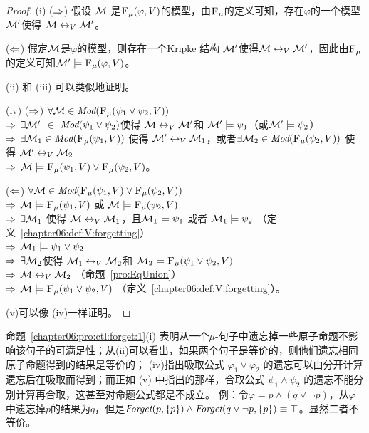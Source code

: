 \begin{proof}
	(i) ($\Rightarrow$) 假设 ${\cal M}$ 是${\textsc{F}_{\textsc{$\mu$}}}(\varphi, V)$的模型，由${\textsc{F}_{\textsc{$\mu$}}}$的定义可知，存在$\varphi$的一个模型${\cal M}'$使得 ${\cal M} \leftrightarrow_V {\cal M}'$。
	
	($\Leftarrow$) 假定${\cal M}$是$\varphi$的模型，则存在一个Kripke 结构 ${\cal M}'$使得${\cal M} \leftrightarrow_V {\cal M}'$，因此由${\textsc{F}_{\textsc{$\mu$}}}$的定义可知${\cal M}' \models {\textsc{F}_{\textsc{$\mu$}}}(\varphi, V)$。
	
	(ii) 和 (iii) 可以类似地证明。
	
	(iv) ($\Rightarrow$) $\forall {\cal M}\in \textit{Mod}({\textsc{F}_{\textsc{$\mu$}}}(\psi_1 \vee \psi_2, V))$\\
	$\Rightarrow$ $\exists {\cal M}'$ $\in$  $\textit{Mod}(\psi_1\vee \psi_2)$使得 ${\cal M} \leftrightarrow_V {\cal M}'$和 ${\cal M}' \models \psi_1$（或${\cal M}' \models \psi_2$） \\
	$\Rightarrow$ $\exists {\cal M}_1 \in \textit{Mod}({\textsc{F}_{\textsc{$\mu$}}}(\psi_1, V))$ 使得 ${\cal M}' \leftrightarrow_V {\cal M}_1$，或者$\exists{\cal M}_2 \in \textit{Mod}({\textsc{F}_{\textsc{$\mu$}}}(\psi_2, V))$ 使得 ${\cal M}' \leftrightarrow_V {\cal M}_2$ \\
	$\Rightarrow$ ${\cal M} \models {\textsc{F}_{\textsc{$\mu$}}}(\psi_1, V) \vee {\textsc{F}_{\textsc{$\mu$}}}(\psi_2, V)$。
	
	($\Leftarrow$) $\forall {\cal M} \in \textit{Mod}({\textsc{F}_{\textsc{$\mu$}}}(\psi_1, V) \vee {\textsc{F}_{\textsc{$\mu$}}}(\psi_2, V))$\\
	$\Rightarrow$ ${\cal M} \models {\textsc{F}_{\textsc{$\mu$}}}(\psi_1,V)$ 或 ${\cal M} \models {\textsc{F}_{\textsc{$\mu$}}}(\psi_2,V)$\\
	$\Rightarrow$ $\exists {\cal M}_1$ 使得 ${\cal M} \leftrightarrow_V {\cal M}_1$，且${\cal M}_1 \models \psi_1$ 或者 ${\cal M}_1 \models \psi_2$ \hfill （定义~\ref{chapter06:def:V:forgetting}）\\
	$\Rightarrow$ ${\cal M}_1 \models \psi_1 \vee \psi_2$\\
	$\Rightarrow$ $\exists {\cal M}_2$使得 ${\cal M}_1 \leftrightarrow_V {\cal M}_2$和 ${\cal M}_2 \models {\textsc{F}_{\textsc{$\mu$}}}(\psi_1 \vee \psi_2, V)$\\
	$\Rightarrow$ ${\cal M} \leftrightarrow_V {\cal M}_2$ （命题~\ref{pro:EqUnion}）\\
	$\Rightarrow$ ${\cal M} \models {\textsc{F}_{\textsc{$\mu$}}}(\psi_1 \vee \psi_2, V)$ （定义~\ref{chapter06:def:V:forgetting}）。
	
	 (v)可以像 (iv)一样证明。
\end{proof}

命题~\ref{chapter06:pro:ctl:forget:1}(i) 表明从一个$\mu$-句子中遗忘掉一些原子命题不影响该句子的可满足性；从(ii)可以看出，如果两个句子是等价的，则他们遗忘相同原子命题得到的结果是等价的； (iv)指出吸取公式 $\varphi_1 \vee \varphi_2$ 的遗忘可以由分开计算遗忘后在吸取而得到；而正如 (v) 中指出的那样，合取公式 $\psi_1 \wedge \psi_2$ 的遗忘不能分别计算再合取，这甚至对命题公式都是不成立。
例：令$\varphi=p \wedge (q \vee \neg p)$，从$\varphi$中遗忘掉$p$的结果为$q$，但是$\textit{Forget}(p, \{p\}) \wedge \textit{Forget}(q\vee \neg p, \{p\}) \equiv \top$。显然二者不等价。

